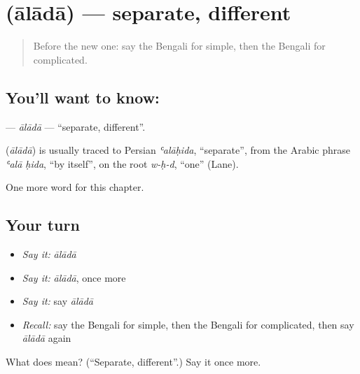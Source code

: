 \section[\texorpdfstring{\bn{আলাদা} (ālādā)}{আলাদা (ālādā)}]{ (ālādā) — separate, different}

\label{lesson:BN-C192-alada}



\begin{quote}
Before the new one: say the Bengali for simple, then the Bengali for complicated.
\end{quote}

\subsection*{You'll want to know: }
\textbf{} — \emph{ālādā} — \textquotedblleft{}separate, different\textquotedblright{}.

\begin{cousinweb}
\textbf{} (\emph{ālādā}) is usually traced to Persian \emph{ʿalāḥida}, \textquotedblleft{}separate\textquotedblright{}, from the Arabic phrase \emph{ʿalā ḥida}, \textquotedblleft{}by itself\textquotedblright{}, on the root \emph{w-ḥ-d}, \textquotedblleft{}one\textquotedblright{} (Lane).
\end{cousinweb}

\begin{grammarlens}[title={What you've built}]
One more word for this chapter.
\end{grammarlens}

\subsection*{Your turn}
\begin{itemize}
\raggedright
  \item \emph{Say it:} \emph{ālādā}
  \item \emph{Say it:} \emph{ālādā}, once more
  \item \emph{Say it:} say \emph{ālādā}
  \item \emph{Recall:} say the Bengali for simple, then the Bengali for complicated, then say \emph{ālādā} again
\end{itemize}

\begin{tcolorbox}[breakable,colback=teal!4,colframe=teal!35!black,title={Before you move on}]
What does  mean? (\textquotedblleft{}Separate, different\textquotedblright{}.) Say it once more.
\end{tcolorbox}
